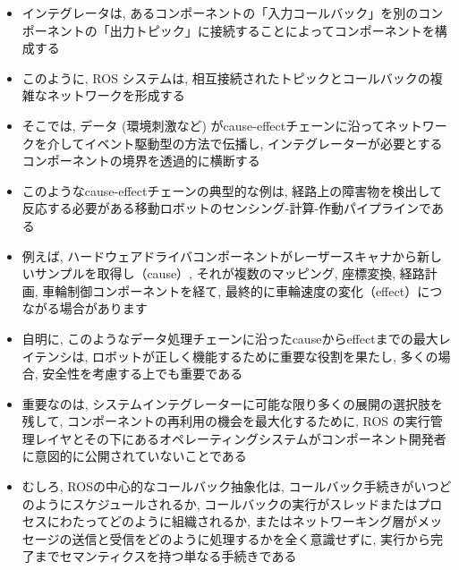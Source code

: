 \begin{frame}{}
    \begin{itemize}
        \item インテグレータは, あるコンポーネントの「入力コールバック」を別のコンポーネントの「出力トピック」に接続することによってコンポーネントを構成する
        \item このように, ROS システムは, 相互接続されたトピックとコールバックの複雑なネットワークを形成する
        \item そこでは, データ (環境刺激など) がcause-effectチェーンに沿ってネットワークを介してイベント駆動型の方法で伝播し, インテグレーターが必要とするコンポーネントの境界を透過的に横断する
    \end{itemize}
\end{frame}


\begin{frame}{}
    \begin{itemize}
        \item このようなcause-effectチェーンの典型的な例は, 経路上の障害物を検出して反応する必要がある移動ロボットのセンシング-計算-作動パイプラインである
        \item 例えば, ハードウェアドライバコンポーネントがレーザースキャナから新しいサンプルを取得し（cause）, それが複数のマッピング, 座標変換, 経路計画, 車輪制御コンポーネントを経て, 最終的に車輪速度の変化（effect）につながる場合があります
        \item 自明に, このようなデータ処理チェーンに沿ったcauseからeffectまでの最大レイテンシは, ロボットが正しく機能するために重要な役割を果たし, 多くの場合, 安全性を考慮する上でも重要である
    \end{itemize}
\end{frame}

\begin{frame}{}
    \begin{itemize}
        \item 重要なのは, システムインテグレーターに可能な限り多くの展開の選択肢を残して, コンポーネントの再利用の機会を最大化するために, ROS の実行管理レイヤとその下にあるオペレーティングシステムがコンポーネント開発者に意図的に公開されていないことである
        \item むしろ, ROSの中心的なコールバック抽象化は, コールバック手続きがいつどのようにスケジュールされるか, コールバックの実行がスレッドまたはプロセスにわたってどのように組織されるか, またはネットワーキング層がメッセージの送信と受信をどのように処理するかを全く意識せずに, 実行から完了までセマンティクスを持つ単なる手続きである
    \end{itemize}
\end{frame}

